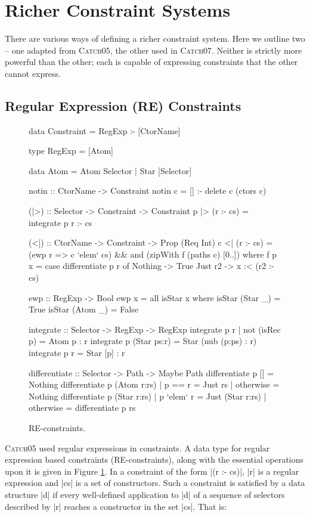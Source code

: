 \documentclass[preprint]{sigplanconf}
\newcommand{\catch}{\textsc{Catch}}
\begin{document}
\section{Richer Constraint Systems}
\label{sec:constraint}

There are various ways of defining a richer constraint system. Here we outline two -- one adapted from \catch05, the other used in \catch07. Neither is strictly more powerful than the other; each is capable of expressing constraints that the other cannot express.

\subsection{Regular Expression (RE) Constraints}
\label{sec:regexp}

\begin{figure}
\begin{code}
data Constraint = RegExp :- [CtorName]

type RegExp = [Atom]

data Atom  =  Atom  Selector
           |  Star  [Selector]

notin :: CtorName -> Constraint
notin c = [] :- delete c (ctors c)

(|>) :: Selector -> Constraint -> Constraint
p |> (r :- cs) = integrate p r :- cs

(<|) :: CtorName -> Constraint -> Prop (Req Int)
c <| (r :- cs) = (ewp r => c `elem` cs) &&
    and (zipWith f (paths c) [0..])
    where
    f p x = case  differentiate p r of
                  Nothing  -> True
                  Just r2  -> x :< (r2 :- cs)

ewp :: RegExp -> Bool
ewp x = all isStar x
   where  isStar (Star  _) = True
          isStar (Atom  _) = False

integrate :: Selector -> RegExp -> RegExp
integrate p r | not (isRec p)  = Atom p : r
integrate p (Star ps:r)        = Star (nub (p:ps) : r)
integrate p r                  = Star [p] : r

differentiate :: Selector -> Path -> Maybe Path
differentiate p [] = Nothing
differentiate p (Atom  r:rs)  | p == r     = Just rs
                              | otherwise  = Nothing
differentiate p (Star  r:rs)  | p `elem` r  = Just (Star r:rs)
                              | otherwise   = differentiate p rs
\end{code}
\caption{RE-constraints.}
\label{fig:regexp}
\end{figure}

\catch05 used regular expressions in constraints. A data type for regular expression based constraints (RE-constraints), along with the essential operations upon it is given in Figure \ref{fig:regexp}. In a constraint of the form |(r :- cs)|, |r| is a regular expression and |cs| is a set of constructors. Such a constraint is satisfied by a data structure |d| if every well-defined application to |d| of a sequence of selectors described by |r| reaches a constructor in the set |cs|. That is:
\end{document}
